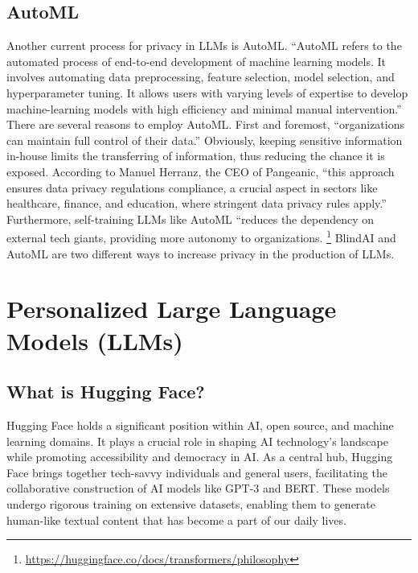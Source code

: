 \documentclass[
]{book}
\begin{document}
\hypertarget{automl}{%
\section{AutoML}\label{automl}}

Another current process for privacy in LLMs is AutoML. ``AutoML refers to the automated process of end-to-end development of machine learning models. It involves automating data preprocessing, feature selection, model selection, and hyperparameter tuning. It allows users with varying levels of expertise to develop machine-learning models with high efficiency and minimal manual intervention.'' There are several reasons to employ AutoML. First and foremost, ``organizations can maintain full control of their data.'' Obviously, keeping sensitive information in-house limits the transferring of information, thus reducing the chance it is exposed. According to Manuel Herranz, the CEO of Pangeanic, ``this approach ensures data privacy regulations compliance, a crucial aspect in sectors like healthcare, finance, and education, where stringent data privacy rules apply.'' Furthermore, self-training LLMs like AutoML ``reduces the dependency on external tech giants, providing more autonomy to organizations. \footnote{\url{https://huggingface.co/docs/transformers/philosophy}} BlindAI and AutoML are two different ways to increase privacy in the production of LLMs.

\hypertarget{personalized-large-language-models-llms}{%
\chapter{Personalized Large Language Models (LLMs)}\label{personalized-large-language-models-llms}}

\hypertarget{what-is-hugging-face}{%
\section{What is Hugging Face?}\label{what-is-hugging-face}}

Hugging Face holds a significant position within AI, open source, and machine learning domains. It plays a crucial role in shaping AI technology's landscape while promoting accessibility and democracy in AI. As a central hub, Hugging Face brings together tech-savvy individuals and general users, facilitating the collaborative construction of AI models like GPT-3 and BERT. These models undergo rigorous training on extensive datasets, enabling them to generate human-like textual content that has become a part of our daily lives.
\end{document}
